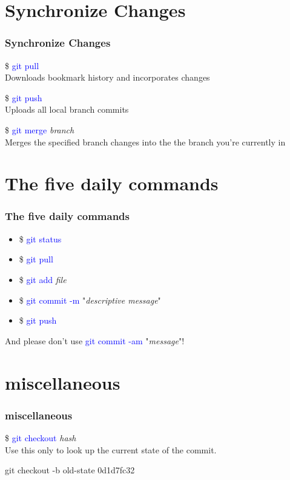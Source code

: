 \documentclass[aspectratio=169]{beamer}
\begin{document}
\section{Synchronize Changes}
\begin{frame}

\frametitle{Synchronize Changes}

\$ \textcolor{blue}{git pull}\\
Downloads bookmark history and incorporates changes

\$ \textcolor{blue}{git push}\\
Uploads all local branch commits

\$ \textcolor{blue}{git merge} \textit{branch}\\
Merges the specified branch changes into the the branch you're currently in

\end{frame}

\section{The five daily commands}
\begin{frame}

\frametitle{The five daily commands}

\begin{itemize}
\item \$ \textcolor{blue}{git status}\\
\item \$ \textcolor{blue}{git pull}\\
\item \$ \textcolor{blue}{git add} \textit{file}\\
\item \$ \textcolor{blue}{git commit -m} "\textit{descriptive message}"\\
\item \$ \textcolor{blue}{git push}\\
\end{itemize}

And please don't use \textcolor{blue}{git commit -am} "\textit{message}"!

\end{frame}

\section{miscellaneous}
\begin{frame}

\frametitle{miscellaneous}

\item \$ \textcolor{blue}{git checkout} \textit{hash}\\
Use this only to look up the current state of the commit.

git checkout -b old-state 0d1d7fc32

\end{frame}

\end{document}
